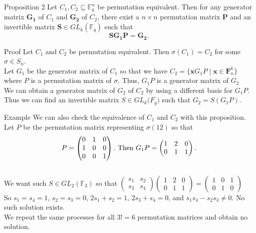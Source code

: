 \begin{frame}[allowframebreaks]
\framebreak
    
    \begin{block}{Proposition 2}
        Let $C_1, C_2 \subseteq \mathbb{F}_q^n$ be permutation equivalent. Then for any generator matrix $\mathbf{G_1}$ of $C_1$ and $\mathbf{G_2}$ of $C_2$, there exist a $n \times n$ permutation matrix $\mathbf{P}$ and an invertible matrix $\mathbf{S} \in GL_k(\mathbb{F}_q)$ such that
        \[
        \mathbf{SG_1P} = \mathbf{G_2}.
        \]
    \end{block}

    \begin{block}{Proof}
        Let $C_1$ and $C_2$ be permutation equivalent. Then $\sigma(C_1) = C_2$ for some $\sigma\in S_n$.\\Let $G_1$ be the generator matrix of $C_1$ so that we have $C_2 = \{\mathbf{x}G_1P \mid\mathbf{x}\in \mathbf{F}_n^k\}$ where $P$ is a permutation matrix of $\sigma$. Thus, $G_1P$ is a generator matrix of $G_2$\\ We can obtain a generator matrix of $G_2$ of $C_2$ by using a different basis for $G_1P$. Thus we can find an invertible matrix $S \in GL_k{\mathbb({F}_q)}$ such that $G_2 = S(G_1P)$.
    \end{block}
    
\framebreak

    \begin{exampleblock}{Example}
        We can also check the equivalence of $C_1$ and $C_2$ with this proposition.
        Let $P$ be the permutation matrix representing $\sigma(12)$ so that
        \[
        P = \begin{pmatrix}
            0 & 1 & 0 \\1 & 0 & 0 \\0 & 0 & 1
        \end{pmatrix}.\\
        \text{ Then }G_1P = \begin{pmatrix}
            1&2&0\\0&1&1
        \end{pmatrix}.
        \]\\
        We want such $S \in GL_2(\mathbb{F}_3)$ so that $\begin{pmatrix}
            s_1&s_2\\s_3&s_4
        \end{pmatrix}\begin{pmatrix}
            1&2&0\\0&1&1
        \end{pmatrix} = \begin{pmatrix}
            1&0&1\\0&1&0
        \end{pmatrix}$\\
        So $s_1=s_4=1$, $s_2=s_3=0$, $2s_1+s_2=1$, $2s_3+s_4=0$, and $s_1s_4-s_2s_3 \neq0$.
        No such solution exists. \\We repeat the same processes for all $3!=6$ permutation matrices and obtain no solution.        
    \end{exampleblock}
    
\end{frame}